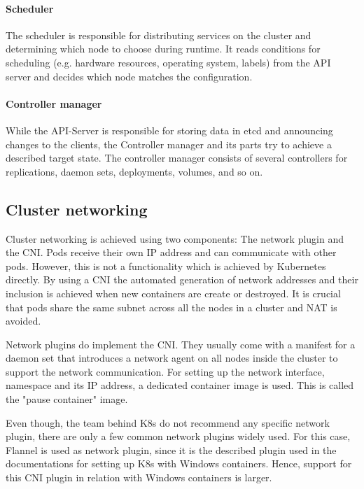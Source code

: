 \paragraph*{Scheduler} The scheduler is responsible for distributing services on the cluster and determining which node to choose during runtime. It reads conditions for scheduling (e.g. hardware resources, operating system, labels) from the \ac{API} server and decides which node matches the configuration\cite{Luksa.2018}.

\paragraph*{Controller manager} While the \ac{API}-Server is responsible for storing data in etcd and announcing changes to the clients, the Controller manager and its parts try to achieve a described target state\cite{Luksa.2018}. The controller manager consists of several controllers for replications, daemon sets, deployments, volumes, and so on.


\subsection{Cluster networking}
Cluster networking is achieved using two components: The network plugin and the \ac{CNI}. Pods receive their own \ac{IP} address and can communicate with other pods. However, this is not a functionality which is achieved by Kubernetes directly. By using a \ac{CNI} the automated generation of network addresses and their inclusion is achieved when new containers are create or destroyed. It is crucial that pods share the same subnet across all the nodes in a cluster and \ac{NAT} is avoided\cite{Luksa.2018}.

Network plugins do implement the \ac{CNI}. They usually come with a manifest for a daemon set that introduces a network agent on all nodes inside the cluster to support the network communication.
For setting up the network interface, namespace and its \ac{IP} address, a dedicated container image is used. This is called the "pause container" image.

Even though, the team behind \ac{K8s} do not recommend any specific network plugin, there are only a few common network plugins widely used. For this case, Flannel is used as network plugin, since it is the described plugin used in the documentations for setting up \ac{K8s} with \ac{Windows} containers\cite{GitHubKubernetesSIGWindowsTools.20230213,Kubernetes.20220419}. Hence, support for this \ac{CNI} plugin in relation with \ac{Windows} containers is larger.

